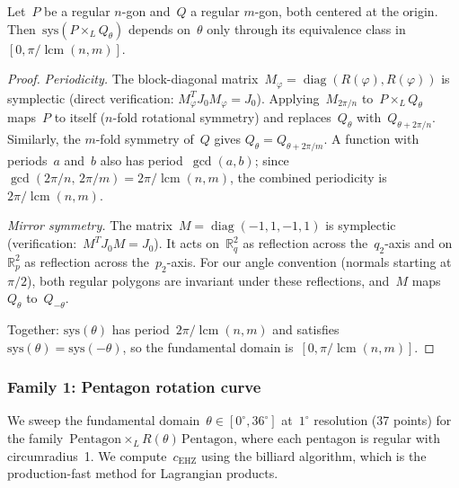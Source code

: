 \begin{unverified}
\begin{lemma}
\label{lem:rotation-fundamental-domain}
Let~$P$ be a regular $n$-gon and~$Q$ a regular $m$-gon, both centered at the
origin. Then~$\mathrm{sys}(P \times_L Q_\theta)$ depends on~$\theta$ only
through its equivalence class in~$[0, \pi/\operatorname{lcm}(n,m)]$.
\end{lemma}

\begin{proof}
\emph{Periodicity.}
The block-diagonal matrix~$M_\varphi = \operatorname{diag}(R(\varphi),
R(\varphi))$ is symplectic (direct verification: $M_\varphi^T J_0 M_\varphi
= J_0$). Applying~$M_{2\pi/n}$ to~$P \times_L Q_\theta$
maps~$P$ to itself ($n$-fold rotational symmetry)
and replaces~$Q_\theta$ with~$Q_{\theta + 2\pi/n}$. Similarly, the $m$-fold symmetry of~$Q$
gives $Q_\theta = Q_{\theta + 2\pi/m}$. A function with periods~$a$
and~$b$ also has period~$\gcd(a,b)$; since
$\gcd(2\pi/n,\, 2\pi/m) = 2\pi/\operatorname{lcm}(n,m)$,
the combined periodicity is~$2\pi/\operatorname{lcm}(n,m)$.

\emph{Mirror symmetry.}
The matrix~$M = \operatorname{diag}(-1, 1, -1, 1)$ is symplectic
(verification:~$M^T J_0 M = J_0$). It acts on~$\mathbb{R}^2_q$ as reflection
across the~$q_2$-axis and on~$\mathbb{R}^2_p$ as reflection across
the~$p_2$-axis. For our angle convention (normals starting at~$\pi/2$), both
regular polygons are invariant under these reflections, and~$M$
maps~$Q_\theta$ to~$Q_{-\theta}$.

Together: $\mathrm{sys}(\theta)$ has period~$2\pi/\operatorname{lcm}(n,m)$ and
satisfies~$\mathrm{sys}(\theta) = \mathrm{sys}(-\theta)$, so the fundamental
domain is~$[0, \pi/\operatorname{lcm}(n,m)]$.
\end{proof}
\end{unverified}


\subsubsection*{Family 1: Pentagon rotation curve}

We sweep the fundamental domain~$\theta \in [0^\circ, 36^\circ]$ at~$1^\circ$ resolution (37 points)
for the family~$\mathrm{Pentagon} \times_L R(\theta)\,\mathrm{Pentagon}$,
where each pentagon is regular with circumradius~1.
We compute~$c_{\mathrm{EHZ}}$ using the billiard algorithm, which is the production-fast method for Lagrangian
products.

